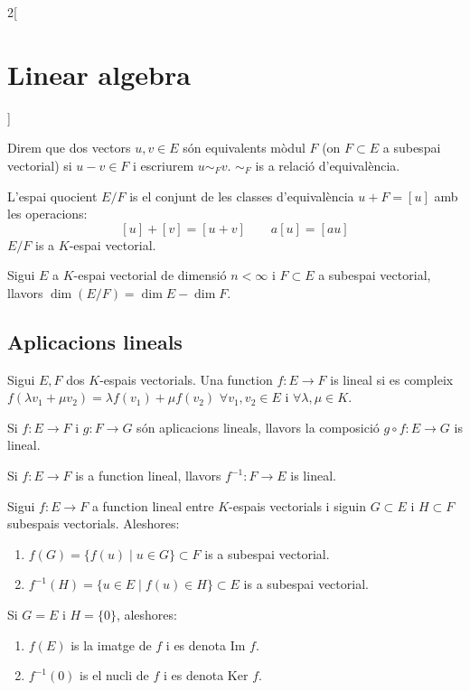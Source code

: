 \documentclass[../../../main.tex]{subfiles}
\begin{document}
\begin{multicols}{2}[\section{Linear algebra}]
\begin{definition}
\end{definition}
\begin{definition}
Direm que dos vectors $u,v\in E$ són equivalents mòdul $F$ (on $F\subset E$ a subespai vectorial) si $u-v\in F$ i escriurem $u\sim_Fv$. $\sim_F$ is a relació d'equivalència.
\end{definition}
\begin{definition}
L'espai quocient $E/F$ is el conjunt de les classes d'equivalència $u+F=[u]$ amb les operacions:
$$[u]+[v]=[u+v]\qquad a[u]=[au]$$ $E/F$ is a $K$-espai vectorial.
\end{definition}
\begin{prop}
Sigui $E$ a $K$-espai vectorial de dimensió $n<\infty$ i $F\subset E$ a subespai vectorial, llavors $\dim (E/F)=\dim E-\dim F$.
\end{prop}
\subsection{Aplicacions lineals}
\begin{definition}
Sigui $E,F$ dos $K$-espais vectorials. Una function $f:E\rightarrow F$ is lineal si es compleix $f(\lambda v_1+\mu v_2)=\lambda f(v_1)+\mu f(v_2)$ $\forall v_1,v_2\in E$ i $\forall\lambda,\mu\in K$.
\end{definition}
\begin{prop}
Si $f:E\rightarrow F$ i $g:F\rightarrow G$ són aplicacions lineals, llavors la composició $g\circ f:E\rightarrow G$ is lineal.
\end{prop}
\begin{prop}
Si $f:E\rightarrow F$ is a function lineal, llavors $f^{-1}:F\rightarrow E$ is lineal.
\end{prop}
\begin{prop}
Sigui $f:E\rightarrow F$ a function lineal entre $K$-espais vectorials i siguin $G\subset E$ i $H\subset F$ subespais vectorials. Aleshores:
\begin{enumerate}
    \item $f(G)=\{f(u)\mid u\in G\}\subset F$ is a subespai vectorial.
    \item $f^{-1}(H)=\{u\in E\mid f(u)\in H\}\subset E$ is a subespai vectorial.
\end{enumerate}
Si $G=E$ i $H=\{0\}$, aleshores:
\begin{enumerate}
    \item $f(E)$ is la imatge de $f$ i es denota $\text{Im }f$.
    \item $f^{-1}(0)$ is el nucli de $f$ i es denota $\text{Ker }f$.

\end{enumerate}
\end{prop}
\end{multicols}
\end{document}
